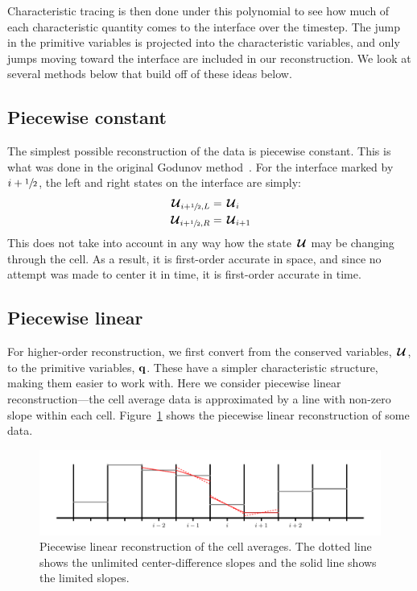 Characteristic tracing is then done under this polynomial to see how
much of each characteristic quantity comes to the interface over the
timestep.  The jump in the primitive variables is projected into the
characteristic variables, and only jumps moving toward the interface
are included in our reconstruction.  We look at several methods below
that build off of these ideas below.

\subsection{Piecewise constant}

The simplest possible reconstruction of the data is piecewise constant.
This is what was done in the original Godunov method~\cite{godunov:1959}.  For the interface
marked by $i+{\sfrac{1}{2}}$, the left and right states on the interface are simply:
\begin{align}
{\,\boldsymbol{\mathcal{U}}}_{i+{\sfrac{1}{2}},L} &= {\,\boldsymbol{\mathcal{U}}}_i \\
{\,\boldsymbol{\mathcal{U}}}_{i+{\sfrac{1}{2}},R} &= {\,\boldsymbol{\mathcal{U}}}_{i+1}
\end{align}
This does not take into account in any way how the state ${\,\boldsymbol{\mathcal{U}}}$ may be changing
through the cell.  As a result, it is first-order accurate in space, and since
no attempt was made to center it in time, it is first-order accurate in time.

\subsection{Piecewise linear}

For higher-order reconstruction, we first convert from the conserved
variables, ${\,\boldsymbol{\mathcal{U}}}$, to the primitive variables, ${\bf q}$.  These have a simpler
characteristic structure, making them easier to work with.  Here we
consider piecewise linear reconstruction---the cell average data is
approximated by a line with non-zero slope within each cell.
Figure~\ref{fig:plm} shows the piecewise linear reconstruction of some
data.


\begin{figure}[t]
\centering
\includegraphics[width=\linewidth]{piecewise-linear}
\caption[Piecewise linear reconstruction of cell average
  data]{\label{fig:plm} Piecewise linear reconstruction of the cell
  averages.  The dotted line shows the unlimited center-difference
  slopes and the solid line shows the limited slopes.}
\end{figure}

